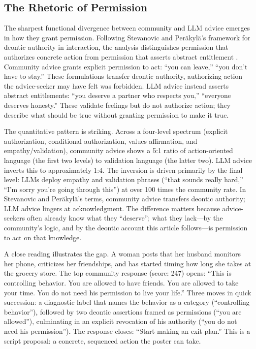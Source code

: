 \subsection{The Rhetoric of Permission}

The sharpest functional divergence between community and LLM advice emerges in how they grant permission. Following Stevanovic and Per\"{a}kyl\"{a}'s framework for deontic authority in interaction, the analysis distinguishes permission that authorizes concrete action from permission that asserts abstract entitlement \citep{stevanovic2012deontic}. Community advice grants explicit permission to act: ``you can leave,'' ``you don't have to stay.'' These formulations transfer deontic authority, authorizing action the advice-seeker may have felt was forbidden. LLM advice instead asserts abstract entitlements: ``you deserve a partner who respects you,'' ``everyone deserves honesty.'' These validate feelings but do not authorize action; they describe what should be true without granting permission to make it true.

The quantitative pattern is striking. Across a four-level spectrum (explicit authorization, conditional authorization, values affirmation, and empathy/validation), community advice shows a 5:1 ratio of action-oriented language (the first two levels) to validation language (the latter two). LLM advice inverts this to approximately 1:4. The inversion is driven primarily by the final level: LLMs deploy empathy and validation phrases (``that sounds really hard,'' ``I'm sorry you're going through this'') at over 100 times the community rate. In Stevanovic and Per\"{a}kyl\"{a}'s terms, community advice transfers deontic authority; LLM advice lingers at acknowledgment. The difference matters because advice-seekers often already know what they ``deserve''; what they lack---by the community's logic, and by the deontic account this article follows---is permission to act on that knowledge.

A close reading illustrates the gap. A woman posts that her husband monitors her phone, criticizes her friendships, and has started timing how long she takes at the grocery store. The top community response (score: 247) opens: ``This is controlling behavior. You are allowed to have friends. You are allowed to take your time. You do not need his permission to live your life.'' Three moves in quick succession: a diagnostic label that names the behavior as a category (``controlling behavior''), followed by two deontic assertions framed as permissions (``you are allowed''), culminating in an explicit revocation of his authority (``you do not need his permission''). The response closes: ``Start making an exit plan.'' This is a script proposal: a concrete, sequenced action the poster can take.

